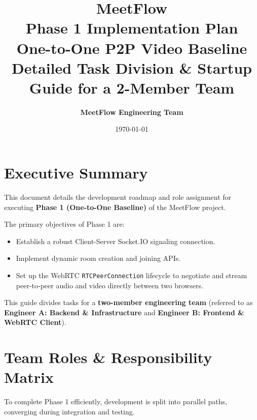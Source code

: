 \documentclass[11pt,a4paper]{article}
\title{
    \vspace{1.5in}
    \Huge \textbf{MeetFlow} \\
    \Large Phase 1 Implementation Plan \\
    \vspace{0.3in}
    \huge \textbf{One-to-One P2P Video Baseline} \\
    \large Detailed Task Division \& Startup Guide for a 2-Member Team
    \vspace{1.5in}
}
\author{
    \textbf{MeetFlow Engineering Team}
}
\date{\today}
\begin{document}
\maketitle
\thispagestyle{empty}
\newpage

\tableofcontents
\newpage

\section{Executive Summary}
This document details the development roadmap and role assignment for executing \textbf{Phase 1 (One-to-One Baseline)} of the MeetFlow project. 

The primary objectives of Phase 1 are:
\begin{itemize}
    \item Establish a robust Client-Server Socket.IO signaling connection.
    \item Implement dynamic room creation and joining APIs.
    \item Set up the WebRTC \texttt{RTCPeerConnection} lifecycle to negotiate and stream peer-to-peer audio and video directly between two browsers.
\end{itemize}

This guide divides tasks for a \textbf{two-member engineering team} (referred to as \textbf{Engineer A: Backend \& Infrastructure} and \textbf{Engineer B: Frontend \& WebRTC Client}).

\section{Team Roles \& Responsibility Matrix}
To complete Phase 1 efficiently, development is split into parallel paths, converging during integration and testing.
\end{document}
